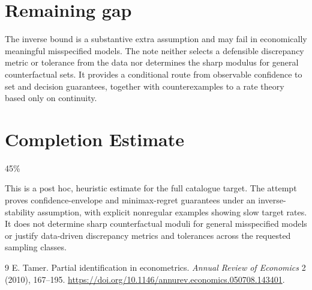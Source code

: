 \documentclass[11pt]{article}
\theoremstyle{remark}
\begin{document}
\section*{Remaining gap}
The inverse bound is a substantive extra assumption and may fail in economically meaningful misspecified models. The note neither selects a defensible discrepancy metric or tolerance from the data nor determines the sharp modulus for general counterfactual sets. It provides a conditional route from observable confidence to set and decision guarantees, together with counterexamples to a rate theory based only on continuity.

\section{Completion Estimate}
45\%

This is a post hoc, heuristic estimate for the full catalogue target.
The attempt proves confidence-envelope and minimax-regret guarantees under an inverse-stability assumption, with explicit nonregular examples showing slow target rates. It does not determine sharp counterfactual moduli for general misspecified models or justify data-driven discrepancy metrics and tolerances across the requested sampling classes.

\begin{thebibliography}{9}
 E. Tamer. Partial identification in econometrics. \emph{Annual Review of Economics} 2 (2010), 167--195. \url{https://doi.org/10.1146/annurev.economics.050708.143401}.
\end{thebibliography}
\end{document}
